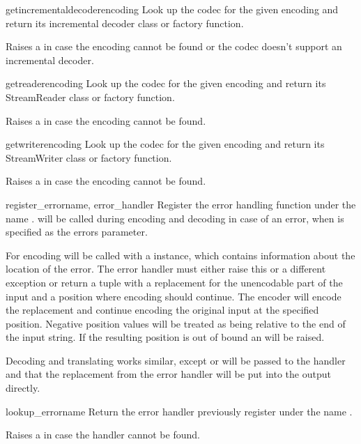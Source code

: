 \begin{funcdesc}{getincrementaldecoder}{encoding}
Look up the codec for the given encoding and return its incremental decoder
class or factory function.

Raises a  in case the encoding cannot be found or the
codec doesn't support an incremental decoder.
\end{funcdesc}

\begin{funcdesc}{getreader}{encoding}
Look up the codec for the given encoding and return its StreamReader
class or factory function.

Raises a  in case the encoding cannot be found.
\end{funcdesc}

\begin{funcdesc}{getwriter}{encoding}
Look up the codec for the given encoding and return its StreamWriter
class or factory function.

Raises a  in case the encoding cannot be found.
\end{funcdesc}

\begin{funcdesc}{register_error}{name, error_handler}
Register the error handling function  under the
name .  will be called during encoding
and decoding in case of an error, when  is specified as the
errors parameter.

For encoding  will be called with a
 instance, which contains information about
the location of the error. The error handler must either raise this or
a different exception or return a tuple with a replacement for the
unencodable part of the input and a position where encoding should
continue. The encoder will encode the replacement and continue encoding
the original input at the specified position. Negative position values
will be treated as being relative to the end of the input string. If the
resulting position is out of bound an  will be raised.

Decoding and translating works similar, except 
or  will be passed to the handler and
that the replacement from the error handler will be put into the output
directly.
\end{funcdesc}

\begin{funcdesc}{lookup_error}{name}
Return the error handler previously register under the name .

Raises a  in case the handler cannot be found.
\end{funcdesc}

